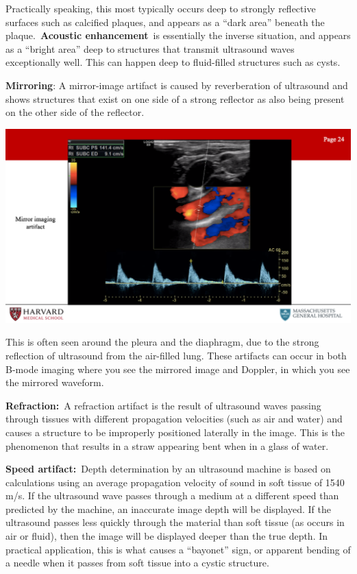 \documentclass[
]{book}
\begin{document}
Practically speaking, this most typically occurs deep to strongly
reflective surfaces such as calcified plaques, and appears as a ``dark
area'' beneath the plaque.~\textbf{Acoustic enhancement}~is essentially the
inverse situation, and appears as a ``bright area'' deep to structures
that transmit ultrasound waves exceptionally well. This can happen deep
to fluid-filled structures such as cysts.

\textbf{Mirroring}: A mirror-image artifact is caused by reverberation of
ultrasound and shows structures that exist on one side of a strong
reflector as also being present on the other side of the reflector.

\includegraphics[width=15.01in]{images/vasc_lab2/Slide25}

This is often seen around the pleura and the diaphragm, due to the
strong reflection of ultrasound from the air-filled lung. These
artifacts can occur in both B-mode imaging where you see the mirrored
image and Doppler, in which you see the mirrored waveform.

\textbf{Refraction:}~A refraction artifact is the result of ultrasound waves
passing through tissues with different propagation velocities (such as
air and water) and causes a structure to be improperly positioned
laterally in the image. This is the phenomenon that results in a straw
appearing bent when in a glass of water.

\textbf{Speed artifact:}~Depth determination by an ultrasound machine is
based on calculations using an average propagation velocity of sound in
soft tissue of 1540 m/s. If the ultrasound wave passes through a medium
at a different speed than predicted by the machine, an inaccurate image
depth will be displayed. If the ultrasound passes less quickly through
the material than soft tissue (as occurs in air or fluid), then the
image will be displayed deeper than the true depth. In practical
application, this is what causes a ``bayonet'' sign, or apparent bending
of a needle when it passes from soft tissue into a cystic structure.
\end{document}

